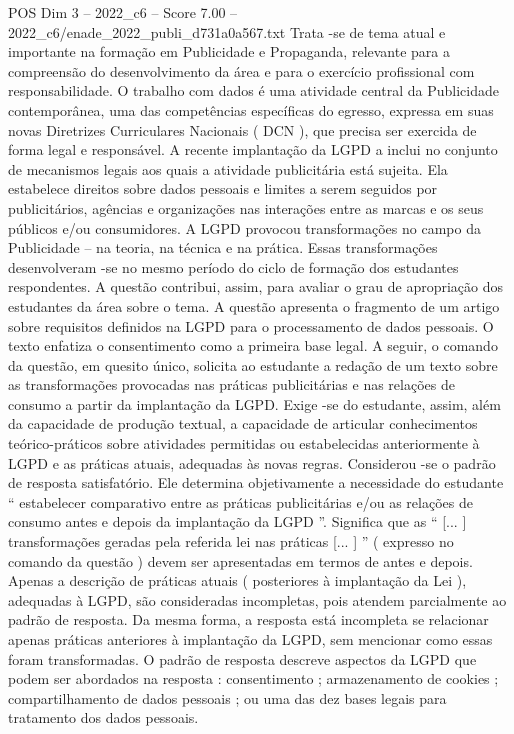\begin{textsample}{POS Dim 3 – 2022\_c6 – Score 7.00 – 2022\_c6/enade\_2022\_publi\_d731a0a567.txt}
Trata -se de tema atual e importante na formação em Publicidade e Propaganda, relevante para a compreensão do desenvolvimento da área e para o exercício profissional com responsabilidade.
O trabalho com dados é uma atividade central da Publicidade contemporânea, uma das competências específicas do egresso, expressa em suas novas Diretrizes Curriculares Nacionais ( DCN ), que precisa ser exercida de forma legal e responsável.
A recente implantação da LGPD a inclui no conjunto de mecanismos legais aos quais a atividade publicitária está sujeita.
Ela estabelece direitos sobre dados pessoais e limites a serem seguidos por publicitários, agências e organizações nas interações entre as marcas e os seus públicos e/ou consumidores.
A LGPD provocou transformações no campo da Publicidade – na teoria, na técnica e na prática.
Essas transformações desenvolveram -se no mesmo período do ciclo de formação dos estudantes respondentes.
A questão contribui, assim, para avaliar o grau de apropriação dos estudantes da área sobre o tema.
A questão apresenta o fragmento de um artigo sobre requisitos definidos na LGPD para o processamento de dados pessoais.
O texto enfatiza o consentimento como a primeira base legal.
A seguir, o comando da questão, em quesito único, solicita ao estudante a redação de um texto sobre as transformações provocadas nas práticas publicitárias e nas relações de consumo a partir da implantação da LGPD.
Exige -se do estudante, assim, além da capacidade de produção textual, a capacidade de articular conhecimentos teórico-práticos sobre atividades permitidas ou estabelecidas anteriormente à LGPD e as práticas atuais, adequadas às novas regras.
Considerou -se o padrão de resposta satisfatório.
Ele determina objetivamente a necessidade do estudante “ estabelecer comparativo entre as práticas publicitárias e/ou as relações de consumo antes e depois da implantação da LGPD ”.
Significa que as “ [... ] transformações geradas pela referida lei nas práticas [... ] ” ( expresso no comando da questão ) devem ser apresentadas em termos de antes e depois.
Apenas a descrição de práticas atuais ( posteriores à implantação da Lei ), adequadas à LGPD, são consideradas incompletas, pois atendem parcialmente ao padrão de resposta.
Da mesma forma, a resposta está incompleta se relacionar apenas práticas anteriores à implantação da LGPD, sem mencionar como essas foram transformadas.
O padrão de resposta descreve aspectos da LGPD que podem ser abordados na resposta : consentimento ; armazenamento de cookies ; compartilhamento de dados pessoais ; ou uma das dez bases legais para tratamento dos dados pessoais.

\end{textsample}
